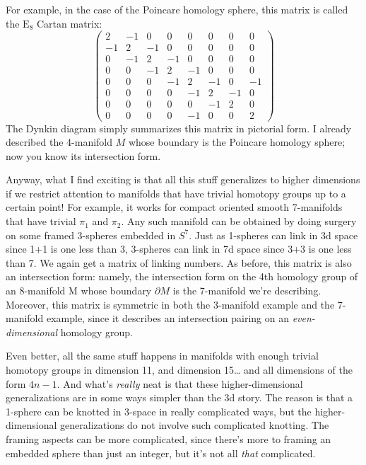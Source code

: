 \documentclass{article}
\begin{document}
For example, in the case of the Poincare homology sphere, this matrix is
called the \(\mathrm{E}_8\) Cartan matrix: \[
  \left(
    \begin{array}{rrrrrrrr}
      2&-1&0&0&0&0&0&0
    \\-1&2&-1&0&0&0&0&0 
    \\0&-1&2&-1&0&0&0&0 
    \\0&0&-1&2&-1&0&0&0 
    \\0&0&0&-1&2&-1&0&-1
    \\0&0&0&0&-1&2&-1&0
    \\0&0&0&0&0&-1&2&0 
    \\0&0&0&0&-1&0&0&2
    \end{array}
  \right)
\] The Dynkin diagram simply summarizes this matrix in pictorial form. I
already described the 4-manifold \(M\) whose boundary is the Poincare
homology sphere; now you know its intersection form.

Anyway, what I find exciting is that all this stuff generalizes to
higher dimensions if we restrict attention to manifolds that have
trivial homotopy groups up to a certain point! For example, it works for
compact oriented smooth 7-manifolds that have trivial \(\pi_1\) and
\(\pi_2\). Any such manifold can be obtained by doing surgery on some
framed 3-spheres embedded in \(S^7\). Just as 1-spheres can link in 3d
space since 1+1 is one less than 3, 3-spheres can link in 7d space since
3+3 is one less than 7. We again get a matrix of linking numbers. As
before, this matrix is also an intersection form: namely, the
intersection form on the 4th homology group of an 8-manifold M whose
boundary \(\partial M\) is the 7-manifold we're describing. Moreover,
this matrix is symmetric in both the 3-manifold example and the
7-manifold example, since it describes an intersection pairing on an
\emph{even-dimensional} homology group.

Even better, all the same stuff happens in manifolds with enough trivial
homotopy groups in dimension 11, and dimension 15\ldots{} and all
dimensions of the form \(4n-1\). And what's \emph{really} neat is that
these higher-dimensional generalizations are in some ways simpler than
the 3d story. The reason is that a 1-sphere can be knotted in 3-space in
really complicated ways, but the higher-dimensional generalizations do
not involve such complicated knotting. The framing aspects can be more
complicated, since there's more to framing an embedded sphere than just
an integer, but it's not all \emph{that} complicated.
\end{document}
